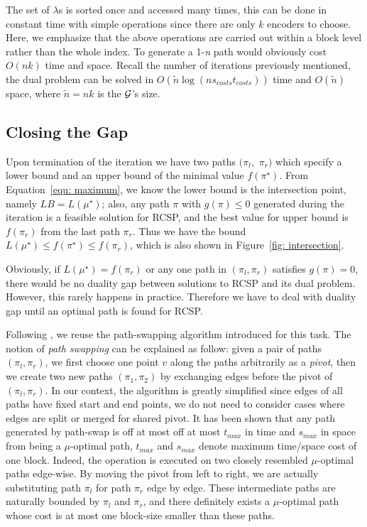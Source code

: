 \documentclass{sig-alternate-05-2015}
\begin{document}
The set of $ \lambda $s is sorted once and accessed many times, this can be done in constant time with simple operations since there are only $ k $ encoders to choose.
Here, we emphasize that the above operations are carried out within a block level rather than the whole index.
To generate a 1-\textit{n} path would obviously cost $ O(nk) $ time and space.
Recall the number of iterations previously mentioned, the dual problem can be solved in $ O(\tilde{n}\log(ns_{costs}t_{costs})) $ time and $ O(\tilde{n}) $ space, where $ \tilde{n} = nk $ is the $ \cal G $'s size.

\subsection{Closing the Gap}
Upon termination of the iteration we have two paths $ (\pi_l,$ $\pi_r) $ which specify a lower bound and an upper bound of the minimal value $ f(\pi^\star) $.
From Equation~\eqref{equ: maximum}, we know the lower bound is the intersection point, namely $ LB = L(\mu^\star) $; also, any path $ \pi $ with $ g(\pi) \leqslant 0 $ generated during the iteration is a feasible solution for RCSP, and the best value for upper bound is $ f(\pi_r) $ from the last path $ \pi_r $.
Thus we have the bound $ L(\mu^\star) \leqslant f(\pi^\star) \leqslant f(\pi_r) $, which is also shown in Figure~\ref{fig: intersection}.

Obviously, if $ L(\mu^\star) = f(\pi_r) $ or any one path in $ (\pi_l,\pi_r) $ satisfies $ g(\pi) = 0 $, there would be no duality gap between solutions to RCSP and its dual problem.
However, this rarely happens in practice.
Therefore we have to deal with duality gap until an optimal path is found for RCSP.

Following \cite{farruggia2014bicriteria}, we reuse the path-swapping algorithm introduced for this task.
The notion of \textit{path swapping} can be explained as follow: given a pair of paths $ (\pi_l,\pi_r) $, we first choose one point $ v $ along the paths arbitrarily as a \textit{pivot}, then we create two new paths $ (\pi_1,\pi_2) $ by exchanging edges before the pivot of $ (\pi_l,\pi_r) $.
In our context, the algorithm is greatly simplified since edges of all paths have fixed start and end points, we do not need to consider cases where edges are split or merged for shared pivot.
It has been shown that any path generated by path-swap is off at most off at most $ t_{max} $ in time and $ s_{max} $ in space from being a $ \mu $-optimal path, $ t_{max} $ and $ s_{max} $ denote maximum time/space cost of one block.
Indeed, the operation is executed on two closely resembled $ \mu $-optimal paths edge-wise.
By moving the pivot from left to right, we are actually substituting path $ \pi_l $ for path $ \pi_r $ edge by edge.
These intermediate paths are naturally bounded by $ \pi_l $ and $ \pi_r $, and there definitely exists a $ \mu $-optimal path whose cost is at most one block-size smaller than these paths.
\end{document}
